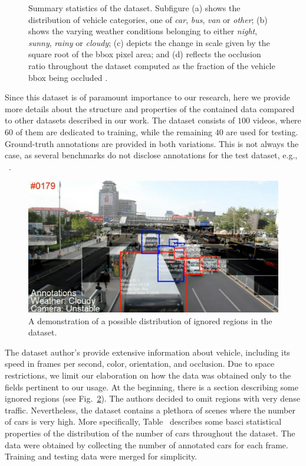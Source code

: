 \begin{figure}[t]
\begin{subfigure}[b]{\uadetracfigsize\textwidth}
        \caption[]{}
    \end{subfigure}
    \caption[ dataset overview]{Summary statistics of the  dataset. Subfigure (a) shows the distribution of vehicle categories, one of \emph{car}, \emph{bus}, \emph{van} or \emph{other}; (b) shows the varying weather conditions belonging to either \emph{night}, \emph{sunny}, \emph{rainy} or \emph{cloudy}; (c) depicts the change in scale given by the square root of the \gls{bbox} pixel area; and (d) reflects the occlusion ratio throughout the dataset computed as the fraction of the vehicle \gls{bbox} being occluded . }
    \label{fig:UADETRACStats}
\end{figure}

Since this dataset is of paramount importance to our research, here we provide more details about the structure and properties of the contained data compared to other datasets described in our work. The dataset consists of $100$ videos, where $60$ of them are dedicated to training, while the remaining $40$ are used for testing. Ground-truth annotations are provided in both variations. This is not always the case, as several benchmarks do not disclose annotations for the test dataset, e.g., ~\cite{Geiger2012CVPR}.

\begin{figure}[t]
    \centerline{\includegraphics[width=0.8\linewidth]{figures/datasets/uadetrac_ignored_regions.png}}
    \caption[Ignored regions in ]{A demonstration of a possible distribution of ignored regions in the  dataset. }
    \label{fig:UADETRACIgnoredRegions}
\end{figure}

The dataset author's provide extensive information about vehicle, including its speed in frames per second, color, orientation, and occlusion. Due to space restrictions, we limit our elaboration on how the data was obtained only to the fields pertinent to our usage. At the beginning, there is a section describing some ignored regions (see Fig.~\ref{fig:UADETRACIgnoredRegions}). The authors decided to omit regions with very dense traffic. Nevertheless, the dataset contains a plethora of scenes where the number of cars is very high. More specifically, Table~ describes some basci statistical properties of the distribution of the number of cars throughout the dataset. The data were obtained by collecting the number of annotated cars for each frame. Training and testing data were merged for simplicity.
